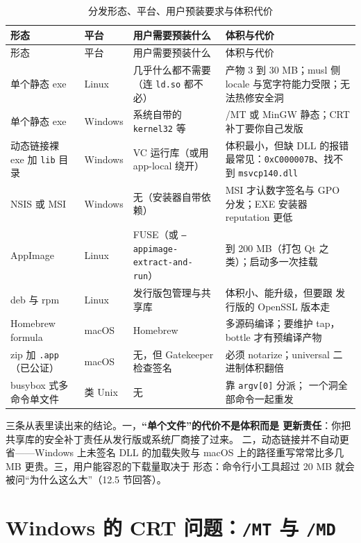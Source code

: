 \documentclass[12pt,a4paper,fontset=fandol]{ctexbook}
\newcommand{\Tp}[1]{\texttt{#1}}
\newcommand{\Bk}{\allowbreak}
\begin{document}
\begin{longtable}{@{}>{\raggedright\arraybackslash}p{}
                 >{\raggedright\arraybackslash}p{}
                 >{\raggedright\arraybackslash}p{}
                 >{\raggedright\arraybackslash}p{}@{}}
\caption{分发形态、平台、用户预装要求与体积代价}
\label{tab:distribution} \\
\toprule
形态 & 平台 & 用户需要预装什么 & 体积与代价 \\
\midrule
\endfirsthead
\toprule
形态 & 平台 & 用户需要预装什么 & 体积与代价 \\
\midrule
\endhead
单个静态 exe & Linux & 几乎什么都不需要（连 \Tp{ld.so} 都不必） &
产物 3 到 30 MB；musl 侧 locale 与宽字符能力受限；无法热修安全洞 \\
单个静态 exe & Windows & 系统自带的 \Tp{kernel32} 等 &
/MT 或 MinGW 静态；CRT 补丁要你自己发版 \\
动态链接裸 exe 加 \Tp{lib} 目录 & Windows & VC 运行库（或用 app-local 绕开） &
体积最小，但缺 DLL 的报错最常见：\Tp{0xC000007B}、找不到
\Tp{msvcp140.dll} \\
NSIS 或 MSI & Windows & 无（安装器自带依赖） & MSI 才认数字签名与
GPO 分发；EXE 安装器 reputation 更低 \\
AppImage & Linux & FUSE（或 \Tp{--appimage\Bk-extract\Bk-and-run}） &
50 到 200 MB（打包 Qt 之类）；启动多一次挂载 \\
deb 与 rpm & Linux & 发行版包管理与共享库 & 体积小、能升级，但要跟
发行版的 OpenSSL 版本走 \\
Homebrew formula & macOS & Homebrew & 多源码编译；要维护 tap，
bottle 才有预编译产物 \\
zip 加 \Tp{.app}（已公证） & macOS & 无，但 Gatekeeper 检查签名 &
必须 notarize；universal 二进制体积翻倍 \\
busybox 式多命令单文件 & 类 Unix & 无 & 靠 \Tp{argv[0]} 分派；
一个洞全部命令一起重发 \\
\bottomrule
\end{longtable}

三条从表里读出来的结论。一，\textbf{``单个文件''的代价不是体积而是
更新责任}：你把共享库的安全补丁责任从发行版或系统厂商接了过来。
二，动态链接并不自动更省——Windows 上未签名 DLL 的加载失败与
macOS 上的路径重写常常比多几 MB 更贵。三，用户能容忍的下载量取决于
形态：命令行小工具超过 20 MB 就会被问``为什么这么大''（12.5 节回答）。

\section{Windows 的 CRT 问题：\Tp{/MT} 与 \Tp{/MD}}
\end{document}

